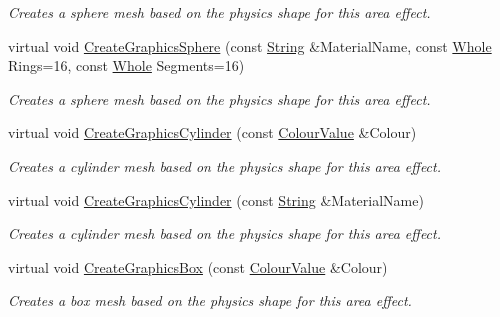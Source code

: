 \begin{DoxyCompactItemize}
\begin{DoxyCompactList}\small\item\em Creates a sphere mesh based on the physics shape for this area effect. \item\end{DoxyCompactList}\item 
virtual void \hyperlink{classphys_1_1AreaEffect_acf78863312a29935efbfdf60c073ae3c}{CreateGraphicsSphere} (const \hyperlink{namespacephys_aa03900411993de7fbfec4789bc1d392e}{String} \&MaterialName, const \hyperlink{namespacephys_a460f6bc24c8dd347b05e0366ae34f34a}{Whole} Rings=16, const \hyperlink{namespacephys_a460f6bc24c8dd347b05e0366ae34f34a}{Whole} Segments=16)
\begin{DoxyCompactList}\small\item\em Creates a sphere mesh based on the physics shape for this area effect. \item\end{DoxyCompactList}\item 
virtual void \hyperlink{classphys_1_1AreaEffect_af9a44284ceb691fdd21e4fc01811f04d}{CreateGraphicsCylinder} (const \hyperlink{classphys_1_1ColourValue}{ColourValue} \&Colour)
\begin{DoxyCompactList}\small\item\em Creates a cylinder mesh based on the physics shape for this area effect. \item\end{DoxyCompactList}\item 
virtual void \hyperlink{classphys_1_1AreaEffect_a7ace0990c2e9282cfc91847fddeac3e0}{CreateGraphicsCylinder} (const \hyperlink{namespacephys_aa03900411993de7fbfec4789bc1d392e}{String} \&MaterialName)
\begin{DoxyCompactList}\small\item\em Creates a cylinder mesh based on the physics shape for this area effect. \item\end{DoxyCompactList}\item 
virtual void \hyperlink{classphys_1_1AreaEffect_a12655c60d5461ef6053c8bdd5cc9afea}{CreateGraphicsBox} (const \hyperlink{classphys_1_1ColourValue}{ColourValue} \&Colour)
\begin{DoxyCompactList}\small\item\em Creates a box mesh based on the physics shape for this area effect. \item\end{DoxyCompactList}\item 

\end{DoxyCompactItemize}
